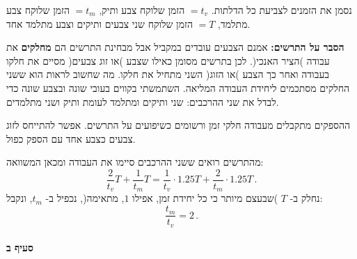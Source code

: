 \documentclass[12pt,a4paper]{article}
\begin{document}
\begin{center}
\end{center}


נסמן את הזמנים לצביעת כל הדלתות. 
$=t_v$
הזמן שלוקח צבע ותיק,
$=t_m$
הזמן שלוקח צבע מתלמד,
$=T$
הזמן שלוקח שני צבעים ותיקים וצבע מתלמד אחד.

\smallskip

\noindent\textbf{הסבר על התרשים:}
אמנם הצבעים עובדים במקביל אבל מבחינת התרשים הם
\textbf{מחלקים}
את עבודה )הציר האנכי(. לכן בתרשים מסומן כאילו שצבע )או זוג צבעים( מסיים את חלקו בעבודה ואחר כך הצבע )או הזוג( השני מתחיל את חלקו. מה שחשוב לראות הוא ששני החלקים מסתכמים ליחידת העבודה המליאה. השתמשתי בקווים בעובי שונה ובצבע שונה כדי לבדל את שני ההרכבים: שני ותיקים ומתלמד לעומת ותיק ושני מתלמדים.

ההספקים מתקבלים מעבודה חלקי זמן ורשומים כשיפועים על התרשים.  אפשר להתייחס לזוג צבעים כצבע אחד עם הספק כפול.

\smallskip

מהתרשים רואים ששני ההרכבים סיימו את העבודה ומכאן המשוואה:
\[
\frac{2}{t_v}T + \frac{1}{t_m} T = \frac{1}{t_v} \cdot 1.25T + \frac{2}{t_m} \cdot 1.25 T\,.
\]
נחלק ב-
$T$
)שבעצם מיותר כי כל יחידת זמן, אפילו
$1$,
מתאימה(, נכפיל ב-
$t_m$,
ונקבל:
\[
\frac{t_m}{t_v}=2\,.
\]

\paragraph{סעיף ב}
\end{document}
